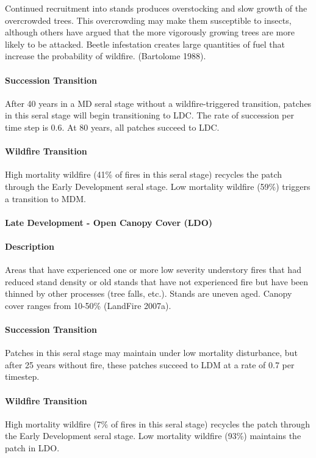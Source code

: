 Continued recruitment into stands produces overstocking and slow growth of the overcrowded trees. This overcrowding may make them susceptible to insects, although others have argued that the more vigorously growing trees are more likely to be attacked. Beetle infestation creates large quantities of fuel that increase the probability of wildfire. (Bartolome 1988).


\paragraph{Succession Transition} After 40 years in a MD seral stage without a wildfire-triggered transition, patches in this seral stage will begin transitioning to LDC. The rate of succession per time step is 0.6. At 80 years, all patches succeed to LDC.

\paragraph{Wildfire Transition} High mortality wildfire (41\% of fires in this seral stage) recycles the patch through the Early Development seral stage. Low mortality wildfire (59\%) triggers a transition to MDM.

\noindent\hrulefill


\paragraph{Late Development - Open Canopy Cover (LDO)}

\paragraph{Description} Areas that have experienced one or more low severity understory fires that had reduced stand density or old stands that have not experienced fire but have been thinned by other processes (tree falls, etc.). Stands are uneven aged. Canopy cover ranges from 10-50\% (LandFire 2007a).

\paragraph{Succession Transition} Patches in this seral stage may maintain under low mortality disturbance, but after 25 years without fire, these patches succeed to LDM at a rate of 0.7 per timestep.

\paragraph{Wildfire Transition} High mortality wildfire (7\% of fires in this seral stage) recycles the patch through the Early Development seral stage. Low mortality wildfire (93\%) maintains the patch in LDO.

